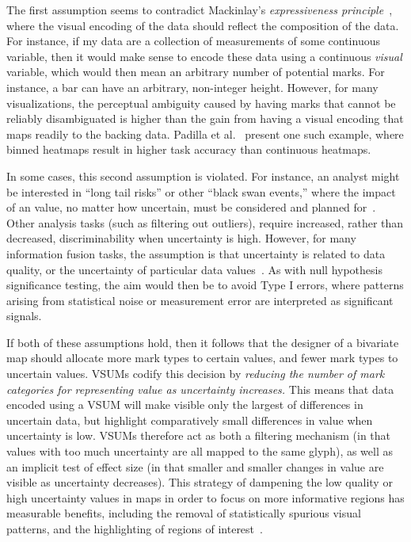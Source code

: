 \documentclass{vgtc}                          %
\begin{document}
The first assumption seems to contradict Mackinlay's \emph{expressiveness principle}~\cite{mackinlay1986automating}, where the visual encoding of the data should reflect the composition of the data. For instance, if my data are a collection of measurements of some continuous variable, then it would make sense to encode these data using a continuous \emph{visual} variable, which would then mean an arbitrary number of potential marks. For instance, a bar can have an arbitrary, non-integer height. However, for many visualizations, the perceptual ambiguity caused by having marks that cannot be reliably disambiguated is higher than the gain from having a visual encoding that maps readily to the backing data. Padilla et al.~\cite{padilla2017evaluating} present one such example, where binned heatmaps result in higher task accuracy than continuous heatmaps.

In some cases, this second assumption is violated. For instance, an analyst might be interested in ``long tail risks'' or other ``black swan events,'' where the impact of an value, no matter how uncertain, must be considered and planned for~\cite{taleb2011black}. Other analysis tasks (such as filtering out outliers), require increased, rather than decreased, discriminability when uncertainty is high. However, for many information fusion tasks, the assumption is that uncertainty is related to data quality, or the uncertainty of particular data values~\cite{riveiro2007evaluation}. As with null hypothesis significance testing, the aim would then be to avoid Type I errors, where patterns arising from statistical noise or measurement error are interpreted as significant signals.

If both of these assumptions hold, then it follows that the designer of a bivariate map should allocate more mark types to certain values, and fewer mark types to uncertain values. VSUMs codify this decision by \emph{reducing the number of mark categories for representing value as uncertainty increases.} This means that data encoded using a VSUM will make visible only the largest of differences in uncertain data, but highlight comparatively small differences in value when uncertainty is low. VSUMs therefore act as both a filtering mechanism (in that values with too much uncertainty are all mapped to the same glyph), as well as an implicit test of effect size (in that smaller and smaller changes in value are visible as uncertainty decreases). This strategy of dampening the low quality or high uncertainty values in maps in order to focus on more informative regions has measurable benefits, including the removal of statistically spurious visual patterns, and the highlighting of regions of interest~\cite{correll2017surprise}.
\end{document}
